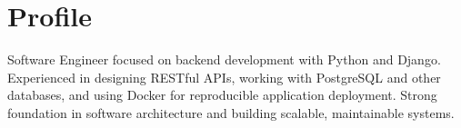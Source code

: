 \section*{Profile}

Software Engineer focused on backend development with Python and Django. Experienced in designing RESTful APIs, working with PostgreSQL and other databases, and using Docker for reproducible application deployment. Strong foundation in software architecture and building scalable, maintainable systems.